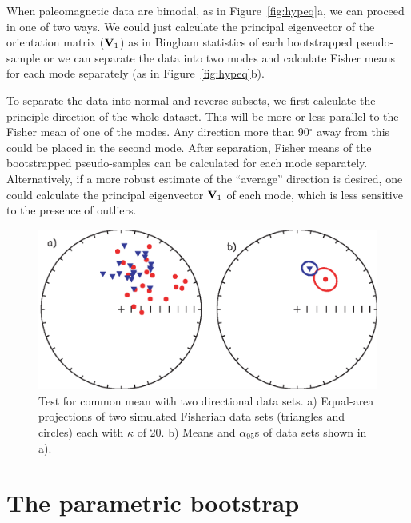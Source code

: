  When paleomagnetic data are bimodal,  as in Figure~\ref{fig:hypeq}a, we can proceed in one of two ways.  We could just calculate the principal eigenvector of the orientation matrix ($\hbox{\bf V}_1$) as in Bingham statistics  of each bootstrapped pseudo-sample or we can separate the data into two modes and calculate Fisher means for each mode separately (as in Figure~\ref{fig:hypeq}b).    

 To  separate the data into normal and reverse subsets, we first calculate the principle direction of the whole dataset.   This will be more or less parallel to the Fisher mean of one of the modes.  Any direction more than 90$^{\circ}$ away from this could be placed in the second mode.      After separation, Fisher means of the bootstrapped pseudo-samples can be calculated for each mode separately.   Alternatively, if a
more robust estimate of the ``average'' direction is desired, one could calculate the 
principal eigenvector $\hbox{\bf V}_1$ of each mode, which is less sensitive to the presence of outliers.



\begin{figure}[htb]
\centering  \includegraphics[width=11 cm]{EPSfiles/twofiles.eps}
\caption {Test for common mean with two directional data sets. 
a) Equal-area projections of   two
simulated Fisherian data sets  (triangles and circles) each with $\kappa$ of 20.  b) Means and $\alpha_{95}$s of  data sets shown in a).  }
\label{fig:twofiles}
\end{figure}


\section {The parametric bootstrap}


